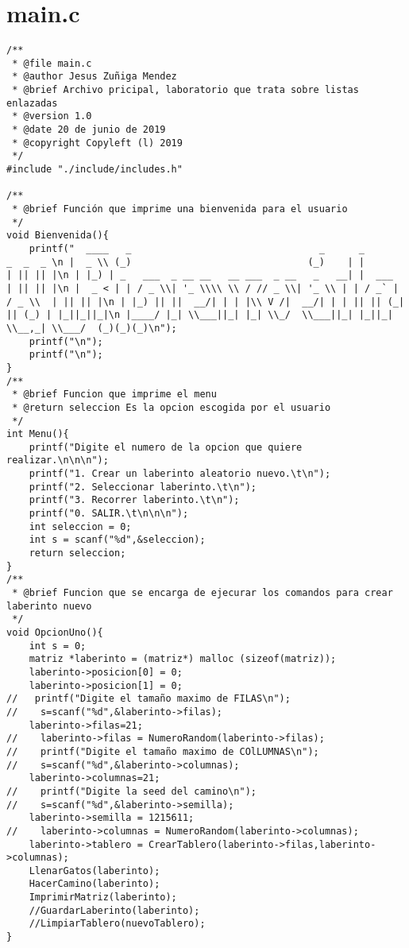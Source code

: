 \section{main.c}
\begin{verbatim}
/**
 * @file main.c
 * @author Jesus Zuñiga Mendez
 * @brief Archivo pricipal, laboratorio que trata sobre listas enlazadas
 * @version 1.0
 * @date 20 de junio de 2019
 * @copyright Copyleft (l) 2019
 */
#include "./include/includes.h"

/**
 * @brief Función que imprime una bienvenida para el usuario
 */
void Bienvenida(){
    printf("  ____   _                                 _      _          _  _  _ \n |  _ \\ (_)                               (_)    | |        | || || |\n | |_) | _   ___  _ __ __   __ ___  _ __   _   __| |  ___   | || || |\n |  _ < | | / _ \\| '_ \\\\ \\ / // _ \\| '_ \\ | | / _` | / _ \\  | || || |\n | |_) || ||  __/| | | |\\ V /|  __/| | | || || (_| || (_) | |_||_||_|\n |____/ |_| \\___||_| |_| \\_/  \\___||_| |_||_| \\__,_| \\___/  (_)(_)(_)\n"); 
    printf("\n");
    printf("\n");
}
/**
 * @brief Funcion que imprime el menu
 * @return seleccion Es la opcion escogida por el usuario
 */
int Menu(){
    printf("Digite el numero de la opcion que quiere realizar.\n\n\n");
    printf("1. Crear un laberinto aleatorio nuevo.\t\n");
    printf("2. Seleccionar laberinto.\t\n");
    printf("3. Recorrer laberinto.\t\n");
    printf("0. SALIR.\t\n\n\n");
    int seleccion = 0;
    int s = scanf("%d",&seleccion);
    return seleccion;
}
/**
 * @brief Funcion que se encarga de ejecurar los comandos para crear laberinto nuevo
 */
void OpcionUno(){
    int s = 0;
    matriz *laberinto = (matriz*) malloc (sizeof(matriz));
    laberinto->posicion[0] = 0;
    laberinto->posicion[1] = 0;
//   printf("Digite el tamaño maximo de FILAS\n");
//    s=scanf("%d",&laberinto->filas);
    laberinto->filas=21;
//    laberinto->filas = NumeroRandom(laberinto->filas);
//    printf("Digite el tamaño maximo de COlLUMNAS\n");
//    s=scanf("%d",&laberinto->columnas);
    laberinto->columnas=21;
//    printf("Digite la seed del camino\n");
//    s=scanf("%d",&laberinto->semilla);
    laberinto->semilla = 1215611;
//    laberinto->columnas = NumeroRandom(laberinto->columnas);
    laberinto->tablero = CrearTablero(laberinto->filas,laberinto->columnas);
    LlenarGatos(laberinto);
    HacerCamino(laberinto);
    ImprimirMatriz(laberinto);
    //GuardarLaberinto(laberinto);
    //LimpiarTablero(nuevoTablero);
}


\end{verbatim}
